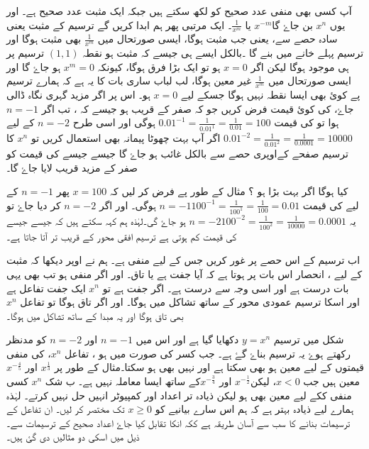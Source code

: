 آپ کسی بھی منفی عدد صحیح  کو  لکھ سکتے ہیں جبکہ  ایک مثبت عدد صحیح ہے۔ اور یوں \( x^{n}  \) بن جاۓ گا\(  x^{-m}   \) یا  \(   \frac{1}{x^{m}}\)۔
ایک مرتبی پھر ہم ابدا کریں گے ترسیم کے مثبت یعنی سادہ حصے سے، یعنی جب  مثبت ہوگا، ایسی صورتحال میں \( \frac{1}{x^{m}}   \)  بھی مثبت ہوگا اور ترسیم پہلے خانے میں بنے گا ۔بالکل ایسے ہی جیسے کہ  مثبت ہو نقطہ \( (1,1)    \)  ترسیم پر ہی موجود ہوگا لیکن اگر \(  x=0    \) ہو تو ایک بڑا فرق ہوگا، کیونکہ \(  x^{m}=0   \)  ہو جاۓ گا اور ایسی صورتحال میں \(   \frac{1}{x^{m}}   \)  غیر معین ہوگا، لب لباب ساری بات کا یہ ہے کہ ہمارے ترسیم پے کوئ بھی ایسا نقطہ نہیں ہوگا جسکے لیے \(      x=0 \) ہو۔
 اس پر اگر مزید گہری نگاہ ڈالی جاۓ،  کی کوئ قیمت فرض کریں جو کہ صفر کے قریب ہو جیسے کہ  ، تب اگر \( n=-1  \)  ہوا  تو  کی قیمت \(  0.01^{-1}=\frac{1}{0.01^{1}}=\frac{1}{0.01}=100\) ہوگی اور اسی طرح \(n=-2    \)  کے لیے \(0.01^{-2}=\frac{1}{0.01^{2}}=\frac{1}{0.0001}=10000\) اگر آپ بہت چھوٹا پیمانہ بھی استعمال کریں تو \(     x^{n} \)  کا ترسیم صفحے کےاوپری حصے سے بالکل غائب ہو جاۓ گا جیسے جیسے  کی قیمت کو صفر کے مزید قریب لایا جاۓ گا۔

کیا ہوگا اگر  بہت بڑا ہو ؟ مثال کے طور پے فرض کر لیں کہ \(x=100  \)  پھر \(   n=-1 \)  کے لیے  کی قیمت \(  n=-1    100^{-1}=\frac{1}{100^{1}}=\frac{1}{100}=0.01\) ہوگی۔ اور اگر \(   n=-2 \)  کر دیا جاۓ تو یہ \(n=-2    100^{-2}=\frac{1}{100^{2}}=\frac{1}{10000}=0.0001\) ہو جاۓ گی۔لہٰذہ ہم کہہ سکتے ہیں کہ جیسے جیسے  کی قیمت کم ہوتی ہے ترسیم افقی محور کے قریب تر آتا جاتا ہے۔

اب ترسیم کے اس حصے پر غور کریں جس کے لیے  منفی ہے۔ ہم نے اوپر دیکھا کہ مثبت  کے لیے ، انحصار اس بات پر ہوتا ہے کہ آیا  جفت ہے یا تاق۔ اور اگر  منفی ہو تب بھی یہی بات درست ہے اور اسی وجہ سے درست ہے۔ اگر  جفت ہے تو \( x^{n}\)  ایک جفت تفاعل ہے اور اسکا ترسیم عمودی محور کے ساتھ تشاکل میں ہوگا۔ اور اگر   تاق ہوگا تو تفاعل \( x^{n}\) 
 بھی تاق ہوگا اور یہ مبدا کے ساتھ تشاکل میں ہوگا۔

شکل  میں ترسیم \(y=x^{n}  \) دکھایا گیا ہے اور اس میں    \(  n=-1  \)  اور  \(  n=-2\) کو مدنظر رکھتے ہوۓ یہ ترسیم  بناۓ  گۓ ہے۔
جب  کسر کی صورت میں ہو ، تفاعل \( x^{n}  \)،  کی منفی قیمتوں کے لیے معین ہو بھی سکتا ہے اور نہیں بھی ہو سکتا۔مثال کے طور پر \(x^{\frac{1}{3}}\) اور \(x^{-\frac{4}{5}}\) معین ہیں جب \(x<0\)، لیکن\(x^{-\frac{1}{2}}\) اور  \(x^{-\frac{3}{4}}\)کے ساتھ ایسا معاملہ نہیں ہے۔ ب شک  \( x^{n}  \) کسی  منفی   ککے لیے معین بھی ہو لیکن ذیادہ تر اعداد اور  کمپیوٹر انہیں حل نہیں کرتے۔ لہٰذہ ہمارے لیے ذیادہ بہتر ہے کہ ہم اس سارے بیانیے کو \(x\ge 0\) تک مختصر کر لیں۔ ان تفاعل کے ترسیمات بنانے کا سب سے آسان طریقہ ہے ککہ انکا تقابل کیا جاۓ اعداد صحیح کے ترسیمات سے۔ ذیل میں اسکی دو مثالیں دی گئ ہیں۔

